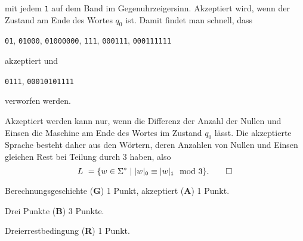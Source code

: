 \begin{loesung}
\begin{teilaufgaben}
mit jedem \texttt{1} auf dem Band im Gegenuhrzeigersinn.
Akzeptiert wird, wenn der Zustand am Ende des Wortes $q_0$ ist.
Damit findet man schnell, dass
\begin{center}
\texttt{01},
\texttt{01000},
\texttt{01000000},
\texttt{111},
\texttt{000111},
\texttt{000111111}
\end{center}
akzeptiert und
\begin{center}
\texttt{0111},
\texttt{00010101111}
\end{center}
verworfen werden.
\item
Akzeptiert werden kann nur, wenn die Differenz der Anzahl der Nullen und
Einsen die Maschine am Ende des Wortes im Zustand $q_0$ lässt.
Die akzeptierte Sprache besteht daher aus den Wörtern, deren Anzahlen
von Nullen und Einsen gleichen Rest bei Teilung durch 3 haben,
also
\[
L = \{
w\in\Sigma^*
\mid
|w|_{\texttt{0}} \equiv |w|_{\texttt{1}} \mod 3
\}.
\qedhere
\]
\end{teilaufgaben}
\end{loesung}

\begin{bewertung}
\begin{teilaufgaben}
\item 
Berechnungsgeschichte ({\bf G}) 1 Punkt,
akzeptiert ({\bf A}) 1 Punkt.
\item
Drei Punkte ({\bf B}) 3 Punkte.
\item
Dreierrestbedingung ({\bf R}) 1 Punkt.
\end{teilaufgaben}
\end{bewertung}
